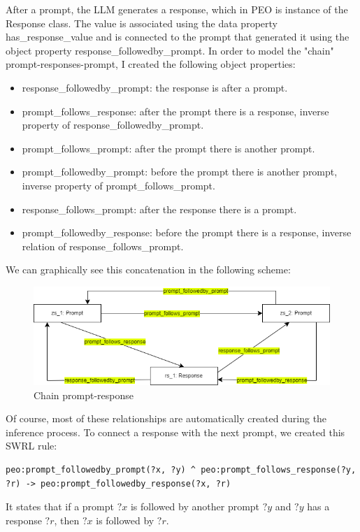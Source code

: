 After a prompt, the LLM generates a response, which in PEO is instance of the Response class.
The value is associated using the data property has\_response\_value and is connected to the prompt that generated it using the object property response\_followedby\_prompt.
In order to model the "chain" prompt-responses-prompt, I created the following object properties:
\begin{itemize}
    \item response\_followedby\_prompt: the response is after a prompt.

    \item prompt\_follows\_response: after the prompt there is a response, inverse property of response\_followedby\_prompt.

    \item prompt\_follows\_prompt: after the prompt there is another prompt.

    \item prompt\_followedby\_prompt: before the prompt there is another prompt, inverse property of {prompt\_follows\_prompt}.

    \item response\_follows\_prompt: after the response there is a prompt.

    \item prompt\_followedby\_response: before the prompt there is a response, inverse relation of response\_follows\_prompt. 
\end{itemize}
We can graphically see this concatenation in the following scheme:
\begin{figure}[H]
    \centering
    \includegraphics[width=0.9\linewidth]{Figures/fig_30.png}
    \caption{Chain prompt-response}
    \label{fig:enter-label}
\end{figure}
Of course, most of these relationships are automatically created during the inference process.
To connect a response with the next prompt, we created this SWRL rule:
\begin{lstlisting}
peo:prompt_followedby_prompt(?x, ?y) ^ peo:prompt_follows_response(?y, ?r) -> peo:prompt_followedby_response(?x, ?r)
\end{lstlisting}
It states that if a prompt $?x$ is followed by another prompt $?y$ and $?y$ has a response $?r$, then $?x$ is followed by $?r$.

